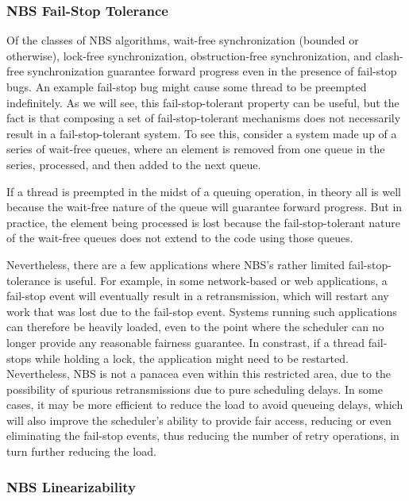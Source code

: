 \fi

\subsubsection{NBS Fail-Stop Tolerance}
\label{sec:advsync:NBS Fail-Stop Tolerance}

Of the classes of NBS algorithms, wait-free synchronization (bounded or
otherwise), lock-free synchronization, obstruction-free synchronization,
and clash-free synchronization guarantee forward progress even in the
presence of fail-stop bugs.
An example fail-stop bug might cause some thread to be preempted indefinitely.
As we will see, this fail-stop-tolerant property can be useful, but the
fact is that composing a set of fail-stop-tolerant mechanisms does not
necessarily result in a fail-stop-tolerant system.
To see this, consider a system made up of a series of wait-free queues,
where an element is removed from one queue in the series, processed,
and then added to the next queue.

If a thread is preempted in the midst of a queuing operation, in theory
all is well because the wait-free nature of the queue will guarantee
forward progress.
But in practice, the element being processed is lost because the
fail-stop-tolerant nature of the wait-free queues does not extend to
the code using those queues.

Nevertheless, there are a few applications where NBS's rather limited
fail-stop-tolerance is useful.
For example, in some network-based or web applications, a fail-stop
event will eventually result in a retransmission, which will restart
any work that was lost due to the fail-stop event.
Systems running such applications can therefore be heavily loaded, even
to the point where the scheduler can no longer provide any reasonable
fairness guarantee.
In constrast, if a thread fail-stops while holding a lock, the application
might need to be restarted.
Nevertheless, NBS is not a panacea even within this restricted area,
due to the possibility of spurious retransmissions due to pure scheduling
delays.
In some cases, it may be more efficient to reduce the load to avoid
queueing delays, which will also improve the scheduler's ability to
provide fair access, reducing or even eliminating the fail-stop events,
thus reducing the number of retry operations, in turn further reducing
the load.

\subsubsection{NBS Linearizability}
\label{sec:advsync:NBS Linearizability}

